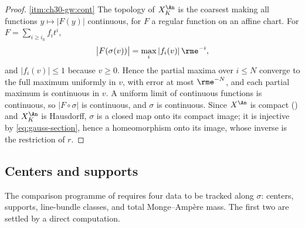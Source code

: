 \begin{proof}
\cref{itm:ch30-gw:cont}  The topology of \(X_K^{\An}\) is the coarsest making
all functions \(y\mapsto|F(y)|\) continuous, for \(F\) a regular function on
an affine chart.  For \(F=\sum_{i\geq i_0}f_it^i\),
\[
 \bigl|F(\sigma(v))\bigr|=\max_i|f_i(v)|\,\rme^{-i},
\]
and \(|f_i(v)|\leq1\) because \(v\geq0\).  Hence the partial maxima over
\(i\leq N\) converge to the full maximum uniformly in \(v\), with error at
most \(\rme^{-N}\), and each partial maximum is continuous in \(v\).  A
uniform limit of continuous functions is continuous, so
\(|F\circ\sigma|\) is continuous, and \(\sigma\) is continuous.  Since
\(X^{\An}\) is compact () and
\(X_K^{\An}\) is Hausdorff, \(\sigma\) is a closed map onto its compact
image; it is injective by \eqref{eq:gauss-section}, hence a homeomorphism
onto its image, whose inverse is the restriction of \(r\).
\end{proof}

\subsection{Centers and supports}
\label{sec:ch30-gauss-centers}

The comparison programme of  requires four data to be
tracked along \(\sigma\): centers, supports, line-bundle classes, and total
Monge--Amp\`ere mass.  The first two are settled by a direct computation.

